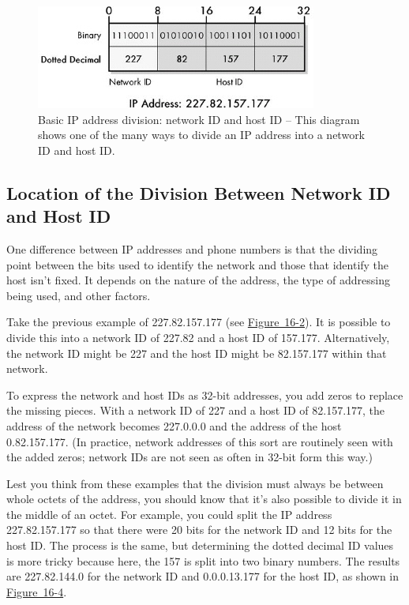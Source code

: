 \begin{figure}
   \centering
   \includegraphics[width=.6\textwidth]{images/ip-address-division.jpg}
   \caption{Basic IP address division: network ID and host ID -- This diagram shows one of the many ways to divide an IP address into a network ID and host ID.}
   \label{fig:ip-address-division}
\end{figure}



\subsection{Location of the Division Between Network ID and Host ID}

One difference between IP addresses and phone numbers is that the
dividing point between the bits used to identify the network and those
that identify the host isn't fixed. It depends on the nature of the
address, the type of addressing being used, and other factors.

Take the previous example of 227.82.157.177 (see
\protect\hyperlink{ch16s02.htmlux5cux23ip_address_binary_hexadecimal_and_dotted}{Figure~16-2}).
It is possible to divide this into a network ID of 227.82 and a host ID
of 157.177. Alternatively, the network ID might be 227 and the host ID
might be 82.157.177 within that network.

To express the network and host IDs as 32-bit addresses, you add zeros
to replace the missing pieces. With a network ID of 227 and a host ID of
82.157.177, the address of the network becomes 227.0.0.0 and the address
of the host 0.82.157.177. (In practice, network addresses of this sort
are routinely seen with the added zeros; network IDs are not seen as
often in 32-bit form this way.)

Lest you think from these examples that the division
must always be between whole octets of the address, you should know that
it's also possible to divide it in the middle of an octet. For example,
you could split the IP address 227.82.157.177 so that there were 20 bits
for the network ID and 12 bits for the host ID. The process is the same,
but determining the dotted decimal ID values is more tricky because
here, the 157 is split into two binary numbers. The results are
227.82.144.0 for the network ID and 0.0.0.13.177 for the host ID, as
shown in
\protect\hyperlink{ch16s03.htmlux5cux23mid-octet_ip_address_division_ip_address}{Figure~16-4}.

